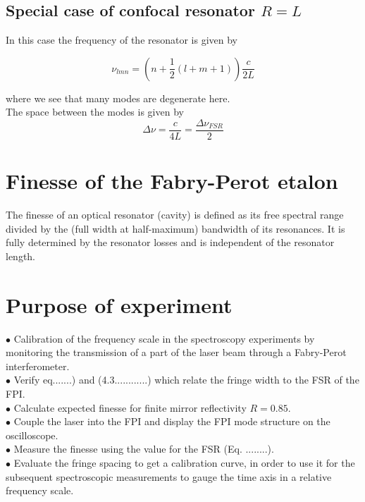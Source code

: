 \documentclass[openany,11pt,a4paper]{book}
\begin{document}
\subsection{Special case of confocal resonator $R=L$}

In this case the frequency of the resonator is given by 

\begin{equation}
\nu _{l m n}=  ( n  + \dfrac{1}{2} (l+m+1))\dfrac{c}{2L}
\end{equation}


where we see that many modes are degenerate here.\\

The space between the modes is given by 
\begin{equation}
\Delta \nu =\dfrac{c}{4L}= \dfrac{ \Delta\nu _{FSR}}{2}
\end{equation}













\section{Finesse of the Fabry-Perot etalon}
The finesse of an optical resonator (cavity) is defined as its free spectral range divided by the (full width at half-maximum) bandwidth of its resonances. It is fully determined by the resonator losses and is independent of the resonator length.\\

\section*{Purpose of experiment}

$ \bullet$ Calibration of the frequency scale in the spectroscopy experiments by monitoring the transmission of a part of the laser beam through a Fabry-Perot interferometer.\\


$\bullet$ Verify eq.......) and (4.3............) which relate the fringe width to the FSR of the FPI.\\
$\bullet$ Calculate expected finesse for finite mirror reflectivity $R=0.85$.\\

$\bullet$ Couple the laser into the FPI and display the FPI mode structure on the oscilloscope.\\
$\bullet$ Measure the finesse using the value for the FSR (Eq. ........).\\
$\bullet$ Evaluate the fringe spacing to get a calibration curve, in order to use it for the subsequent spectroscopic measurements to gauge the time axis in a relative frequency scale.\\
\end{document}

